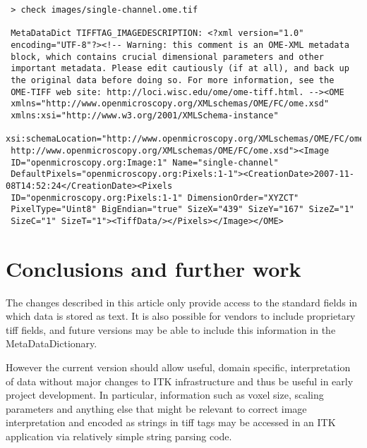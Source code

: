 \documentclass{InsightArticle}
\begin{document}
\small \begin{verbatim} 
 > check images/single-channel.ome.tif

 MetaDataDict TIFFTAG_IMAGEDESCRIPTION: <?xml version="1.0"
 encoding="UTF-8"?><!-- Warning: this comment is an OME-XML metadata
 block, which contains crucial dimensional parameters and other
 important metadata. Please edit cautiously (if at all), and back up
 the original data before doing so. For more information, see the
 OME-TIFF web site: http://loci.wisc.edu/ome/ome-tiff.html. --><OME
 xmlns="http://www.openmicroscopy.org/XMLschemas/OME/FC/ome.xsd"
 xmlns:xsi="http://www.w3.org/2001/XMLSchema-instance"
 xsi:schemaLocation="http://www.openmicroscopy.org/XMLschemas/OME/FC/ome.xsd
 http://www.openmicroscopy.org/XMLschemas/OME/FC/ome.xsd"><Image
 ID="openmicroscopy.org:Image:1" Name="single-channel"
 DefaultPixels="openmicroscopy.org:Pixels:1-1"><CreationDate>2007-11-08T14:52:24</CreationDate><Pixels
 ID="openmicroscopy.org:Pixels:1-1" DimensionOrder="XYZCT"
 PixelType="Uint8" BigEndian="true" SizeX="439" SizeY="167" SizeZ="1"
 SizeC="1" SizeT="1"><TiffData/></Pixels></Image></OME>

\end{verbatim} \normalsize

\section{Conclusions and further work}
The changes described in this article only provide access to the
standard fields in which data is stored as text. It is also possible
for vendors to include proprietary tiff fields, and future versions
may be able to include this information in the MetaDataDictionary.

However the current version should allow useful, domain specific,
interpretation of data without major changes to ITK infrastructure and
thus be useful in early project development. In particular,
information such as voxel size, scaling parameters and anything else
that might be relevant to correct image interpretation and encoded as
strings in tiff tags may be accessed in an ITK application via
relatively simple string parsing code.

\appendix





\nocite{ITKSoftwareGuide}
\end{document}
